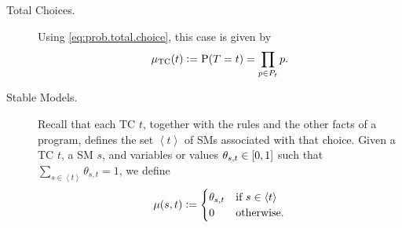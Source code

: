 \documentclass[adraft,copyright,creativecommons]{eptcs}
\newcommand{\at}[1]{\ensuremath{\!\del{#1}}}
\newcommand{\pr}[1]{\ensuremath{\mathrm{P}\at{#1}}}
\newcommand{\pw}[1]{\ensuremath{\mu\at{#1}}}
\newcommand{\pwcfname}{\ensuremath{\mu_{\textrm{TC}}}}
\newcommand{\pwc}[1]{\ensuremath{\pwcfname\at{#1}}}
\newcommand{\tcgen}[1]{\ensuremath{\left<#1\right>}}
\begin{document}
\begin{description}
    \item[Total Choices.] Using \cref{eq:prob.total.choice}, this case is given by
          \begin{equation}
              \pwc{t} := \pr{T = t}= \prod_{p\in P_t} p.
              \label{eq:measure.tchoice}
          \end{equation}

    \item[Stable Models.] Recall that each \acl{TC} $t$, together with the rules and the other facts of a program, defines the set \tcgen{t} of \aclp{SM} associated with that choice.
            Given a \acl{TC} $t$, a \acl{SM} $s$, and variables or values $\theta_{s,t} \in \intcc{0, 1}$ such that $\sum_{s\in \tcgen{t}} \theta_{s,t} = 1$, we define
          \begin{equation}
              \pw{s, t} := \begin{cases}
                  \theta_{s,t} & \text{if~} s \in \tcgen{t}\cr
                  0            & \text{otherwise.}
              \end{cases}
              \label{eq:measure.stablemodel}
          \end{equation}



\end{description}
\end{document}
